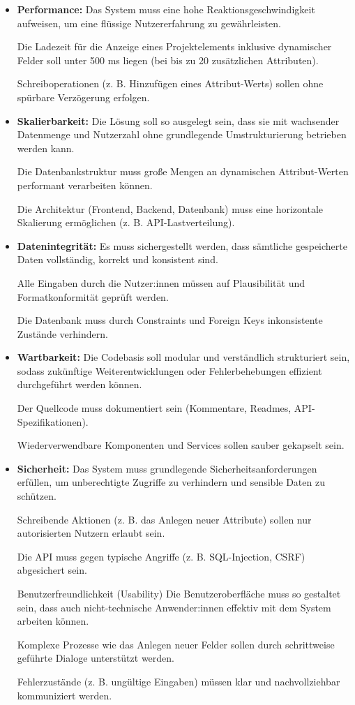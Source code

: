 \begin{itemize}
  \item \textbf{Performance:}
Das System muss eine hohe Reaktionsgeschwindigkeit aufweisen, um eine flüssige Nutzererfahrung zu gewährleisten.

Die Ladezeit für die Anzeige eines Projektelements inklusive dynamischer Felder soll unter 500 ms liegen (bei bis zu 20 zusätzlichen Attributen).

Schreiboperationen (z. B. Hinzufügen eines Attribut-Werts) sollen ohne spürbare Verzögerung erfolgen.

\item \textbf{Skalierbarkeit:}
Die Lösung soll so ausgelegt sein, dass sie mit wachsender Datenmenge und Nutzerzahl ohne grundlegende Umstrukturierung betrieben werden kann.

Die Datenbankstruktur muss große Mengen an dynamischen Attribut-Werten performant verarbeiten können.

Die Architektur (Frontend, Backend, Datenbank) muss eine horizontale Skalierung ermöglichen (z. B. API-Lastverteilung).

\item \textbf{Datenintegrität:}
Es muss sichergestellt werden, dass sämtliche gespeicherte Daten vollständig, korrekt und konsistent sind.

Alle Eingaben durch die Nutzer:innen müssen auf Plausibilität und Formatkonformität geprüft werden.

Die Datenbank muss durch Constraints und Foreign Keys inkonsistente Zustände verhindern.

\item \textbf{Wartbarkeit:}
Die Codebasis soll modular und verständlich strukturiert sein, sodass zukünftige Weiterentwicklungen oder Fehlerbehebungen effizient durchgeführt werden können.

Der Quellcode muss dokumentiert sein (Kommentare, Readmes, API-Spezifikationen).

Wiederverwendbare Komponenten und Services sollen sauber gekapselt sein.

\item \textbf{Sicherheit:}
Das System muss grundlegende Sicherheitsanforderungen erfüllen, um unberechtigte Zugriffe zu verhindern und sensible Daten zu schützen.

Schreibende Aktionen (z. B. das Anlegen neuer Attribute) sollen nur autorisierten Nutzern erlaubt sein.

Die API muss gegen typische Angriffe (z. B. SQL-Injection, CSRF) abgesichert sein.

Benutzerfreundlichkeit (Usability)
Die Benutzeroberfläche muss so gestaltet sein, dass auch nicht-technische Anwender:innen effektiv mit dem System arbeiten können.

Komplexe Prozesse wie das Anlegen neuer Felder sollen durch schrittweise geführte Dialoge unterstützt werden.

Fehlerzustände (z. B. ungültige Eingaben) müssen klar und nachvollziehbar kommuniziert werden.

\end{itemize}
